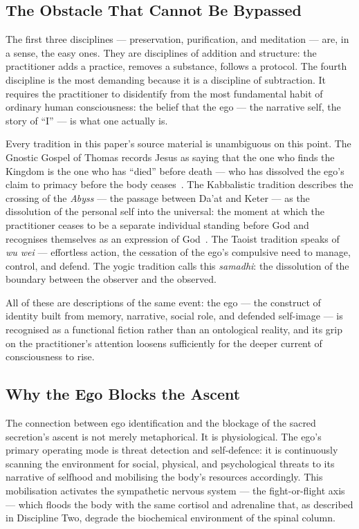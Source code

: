 \documentclass[12pt, a4paper]{article}
\begin{document}
\subsection{The Obstacle That Cannot Be Bypassed}

The first three disciplines — preservation, purification, and meditation —
are, in a sense, the easy ones. They are disciplines of addition and
structure: the practitioner adds a practice, removes a substance, follows a
protocol. The fourth discipline is the most demanding because it is a
discipline of subtraction. It requires the practitioner to disidentify from
the most fundamental habit of ordinary human consciousness: the belief that
the ego — the narrative self, the story of ``I'' — is what one actually is.

Every tradition in this paper's source material is unambiguous on this point.
The Gnostic Gospel of Thomas records Jesus as saying that the one who finds
the Kingdom is the one who has ``died'' before death — who has dissolved the
ego's claim to primacy before the body ceases~\autocite{naglibhammadi}. The
Kabbalistic tradition describes the crossing of the \emph{Abyss} — the passage
between Da'at and Keter — as the dissolution of the personal self into the
universal: the moment at which the practitioner ceases to be a separate
individual standing before God and recognises themselves as an expression of
God~\autocite{regardie1932}. The Taoist tradition speaks of
\emph{wu wei} — effortless action, the cessation of the ego's compulsive need
to manage, control, and defend. The yogic tradition calls this \emph{samadhi}:
the dissolution of the boundary between the observer and the observed.

All of these are descriptions of the same event: the ego — the construct of
identity built from memory, narrative, social role, and defended self-image —
is recognised as a functional fiction rather than an ontological reality, and
its grip on the practitioner's attention loosens sufficiently for the deeper
current of consciousness to rise.

\subsection{Why the Ego Blocks the Ascent}

The connection between ego identification and the blockage of the sacred
secretion's ascent is not merely metaphorical. It is physiological. The ego's
primary operating mode is threat detection and self-defence: it is
continuously scanning the environment for social, physical, and psychological
threats to its narrative of selfhood and mobilising the body's resources
accordingly. This mobilisation activates the sympathetic nervous system —
the fight-or-flight axis — which floods the body with the same cortisol and
adrenaline that, as described in Discipline Two, degrade the biochemical
environment of the spinal column.
\end{document}
